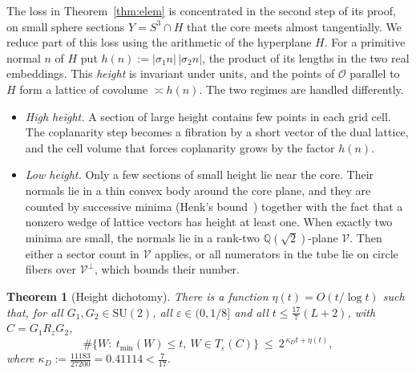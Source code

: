 \documentclass[aps,prx,twocolumn,superscriptaddress,nofootinbib,longbibliography]{revtex4-2}
\theoremstyle{plain}
\newtheorem{theorem}{Theorem}
\theoremstyle{definition}
\theoremstyle{remark}
\newcommand{\Q}{\mathbb{Q}}
\newcommand{\SU}{\mathrm{SU}(2)}
\begin{document}
The loss in Theorem~\ref{thm:elem} is concentrated in the second step of its proof, on small sphere sections $Y=S^3\cap H$ that the core meets almost tangentially. We reduce part of this loss using the arithmetic of the hyperplane $H$. For a primitive normal $n$ of $H$ put $h(n):=|\sigma_1n|\,|\sigma_2n|$, the product of its lengths in the two real embeddings. This \emph{height} is invariant under units, and the points of $\mathcal O$ parallel to $H$ form a lattice of covolume $\asymp h(n)$. The two regimes are handled differently.
\begin{itemize}
\item \emph{High height.} A section of large height contains few points in each grid cell. The coplanarity step becomes a fibration by a short vector of the dual lattice, and the cell volume that forces coplanarity grows by the factor $h(n)$.
\item \emph{Low height.} Only a few sections of small height lie near the core. Their normals lie in a thin convex body around the core plane, and they are counted by successive minima (Henk's bound~\cite{Henk}) together with the fact that a nonzero wedge of lattice vectors has height at least one. When exactly two minima are small, the normals lie in a rank-two $\Q(\sqrt2)$-plane $\mathcal V$. Then either a sector count in $\mathcal V$ applies, or all numerators in the tube lie on circle fibers over $\mathcal V^\perp$, which bounds their number.
\end{itemize}

\begin{theorem}[Height dichotomy]\label{thm:dioph}
There is a function $\eta(t)=O(t/\log t)$ such that, for all $G_1,G_2\in\SU$, all $\varepsilon\in(0,1/8]$ and all $t\le\tfrac{17}7(L+2)$, with $C=G_1R_zG_2$,
\begin{equation}\label{eq:dioph}
\#\{W:\ t_{\min}(W)\le t,\ W\in T_\varepsilon(C)\}\ \le\ 2^{\,\kappa_Dt+\eta(t)},
\end{equation}
where $\kappa_D:=\tfrac{11183}{27200}=0.41114<\tfrac7{17}$.
\end{theorem}
\end{document}
